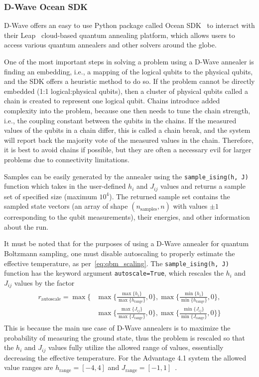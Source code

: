 \subsubsection{D-Wave Ocean SDK}
D-Wave offers an easy to use Python package called Ocean SDK~\cite{dwave_ocean} to interact with their Leap~\cite{dwave_leap} cloud-based quantum annealing platform, which allows users to access various quantum annealers and other solvers around the globe.

One of the most important steps in solving a problem using a D-Wave annealer is finding an embedding, i.e., a mapping of the logical qubits to the physical qubits, and the SDK offers a heuristic method to do so.
If the problem cannot be directly embedded (1:1 logical:physical qubits), then a cluster of physical qubits called a chain is created to represent one logical qubit.
Chains introduce added complexity into the problem, because one then needs to tune the chain strength, i.e., the coupling constant between the qubits in the chains.
If the measured values of the qubits in a chain differ, this is called a chain break, and the system will report back the majority vote of the measured values in the chain.
Therefore, it is best to avoid chains if possible, but they are often a necessary evil for larger problems due to connectivity limitations.

Samples can be easily generated by the annealer using the \texttt{sample\_ising(h, J)} function which takes in the user-defined \( h_i \) and \( J_{ij} \) values and returns a sample set of specified size (maximum \( 10^4 \)).
The returned sample set contains the sampled state vectors (an array of shape \( (n_\text{samples}, n) \) with values \( \pm 1 \) corresponding to the qubit measurements), their energies, and other information about the run.

It must be noted that for the purposes of using a D-Wave annealer for quantum Boltzmann sampling, one must disable autoscaling to properly estimate the effective temperature, as per~\cref{eq:qbm_scaling}.
The \texttt{sample\_ising(h, J)} function has the keyword argument \texttt{autoscale=True}, which rescales the \( h_i \) and \( J_{ij} \) values by the factor~\cite{dwave_solver_parameters}
\begin{align}
\begin{split}
    r_\text{autoscale}
        = \max\Bigg\{
            &\max\bigg\{\frac{\max\{h_i\}}{\max\{h_\text{range}\}},0\bigg\},
            \max\bigg\{\frac{\min\{h_i\}}{\min\{h_\text{range}\}},0\bigg\}, \\
            &\max\bigg\{\frac{\max\{J_{ij}\}}{\max\{J_\text{range}\}},0\bigg\},
            \max\bigg\{\frac{\min\{J_{ij}\}}{\min\{J_\text{range}\}},0\bigg\}
        \Bigg\}
\end{split}
\end{align}
This is because the main use case of D-Wave annealers is to maximize the probability of measuring the ground state, thus the problem is rescaled so that the \( h_i \) and \( J_{ij} \) values fully utilize the allowed range of values, essentially decreasing the effective temperature.
For the Advantage 4.1 system the allowed value ranges are \( h_\text{range} = [-4, 4] \) and \( J_\text{range} = [-1, 1] \)~\cite{dwave_solver_properties}.

